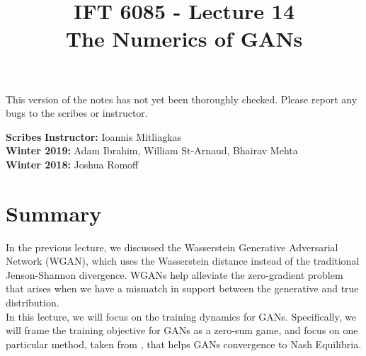 \documentclass{article}
\title{IFT 6085 - Lecture 14 \\ 
The Numerics of GANs }
\date{}
\begin{document}
 

\maketitle

\vspace{-0.5in}
\begin{center}
This version of the notes has not yet been thoroughly checked.
Please report any bugs to the scribes or instructor.
\end{center}
\vspace{0.2in}

\textbf{Scribes}\hfill
\textbf{Instructor:}  Ioannis Mitliagkas\\
\textbf{Winter 2019:} Adam Ibrahim, William St-Arnaud, Bhairav Mehta \\
\textbf{Winter 2018:} Joshua Romoff



\newcommand{\infgc}{\inf_{g \in \mathcal{C}}}
\newcommand{\supgc}{\sup_{g \in \mathcal{C}}}

\newcommand{\Prob}{\mathbb{P}}
\newcommand{\E}{\mathbb{E}}
\newcommand{\reals}{\mathbb{R}}

\section{Summary}

In the previous lecture, we discussed the Wasserstein Generative Adversarial Network (WGAN), which uses the Wasserstein distance instead of the traditional Jenson-Shannon divergence. WGANs help alleviate the zero-gradient problem that arises when we have a mismatch in support between the generative and true distribution.
\\

In this lecture, we will focus on the training dynamics for GANs. Specifically, we will frame the training objective for GANs as a zero-sum game, and focus on one particular method, taken from \cite{MeschederNG17a}, that helps GANs convergence to Nash Equilibria. 
\end{document}
